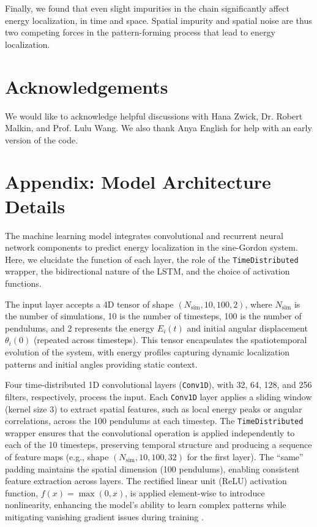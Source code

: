 \documentclass[11pt]{article}
\begin{document}
Finally, we found that even slight impurities in the chain significantly affect energy localization, in time and space. Spatial impurity and spatial noise are thus two competing forces in the pattern-forming process that lead to energy localization.

\section*{Acknowledgements}
We would like to acknowledge helpful discussions with Hana Zwick, Dr. Robert Malkin, and Prof. Lulu Wang. We also thank Anya English for help with an early version of the code.

\section*{Appendix: Model Architecture Details}
The machine learning model integrates convolutional and recurrent neural network components to predict energy localization in the sine-Gordon system. Here, we elucidate the function of each layer, the role of the \texttt{TimeDistributed} wrapper, the bidirectional nature of the LSTM, and the choice of activation functions.

The input layer accepts a 4D tensor of shape $(N_{\text{sim}}, 10, 100, 2)$, where $N_{\text{sim}}$ is the number of simulations, 10 is the number of timesteps, 100 is the number of pendulums, and 2 represents the energy $E_i(t)$ and initial angular displacement $\theta_i(0)$ (repeated across timesteps). This tensor encapsulates the spatiotemporal evolution of the system, with energy profiles capturing dynamic localization patterns and initial angles providing static context.

Four time-distributed 1D convolutional layers (\texttt{Conv1D}), with 32, 64, 128, and 256 filters, respectively, process the input. Each \texttt{Conv1D} layer applies a sliding window (kernel size 3) to extract spatial features, such as local energy peaks or angular correlations, across the 100 pendulums at each timestep. The \texttt{TimeDistributed} wrapper ensures that the convolutional operation is applied independently to each of the 10 timesteps, preserving temporal structure and producing a sequence of feature maps (e.g., shape $(N_{\text{sim}}, 10, 100, 32)$ for the first layer). The ``same'' padding maintains the spatial dimension (100 pendulums), enabling consistent feature extraction across layers. The rectified linear unit (ReLU) activation function, $f(x) = \max(0, x)$, is applied element-wise to introduce nonlinearity, enhancing the model's ability to learn complex patterns while mitigating vanishing gradient issues during training \cite{Goodfellow-et-al-2016}.
\end{document}
